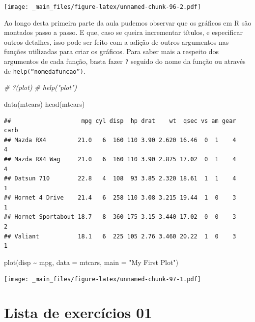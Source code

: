 \documentclass[
]{book}
\newenvironment{Shaded}{\begin{snugshade}}{\end{snugshade}}
\newcommand{\AttributeTok}[1]{\textcolor[rgb]{0.77,0.63,0.00}{#1}}
\newcommand{\CommentTok}[1]{\textcolor[rgb]{0.56,0.35,0.01}{\textit{#1}}}
\newcommand{\FunctionTok}[1]{\textcolor[rgb]{0.00,0.00,0.00}{#1}}
\newcommand{\NormalTok}[1]{#1}
\newcommand{\SpecialCharTok}[1]{\textcolor[rgb]{0.00,0.00,0.00}{#1}}
\newcommand{\StringTok}[1]{\textcolor[rgb]{0.31,0.60,0.02}{#1}}
\begin{document}
\texttt{[image: \_main\_files/figure-latex/unnamed-chunk-96-2.pdf]}

Ao longo desta primeira parte da aula pudemos observar que os gráficos em R são montados passo a passo. E que, caso se queira incrementar títulos, e especificar outros detalhes, isso pode ser feito com a adição de outros argumentos nas funções utilizadas para criar os gráficos. Para saber mais a respeito dos argumentos de cada função, basta fazer \texttt{?} seguido do nome da função ou através de \texttt{help(“nomedafuncao”)}.

\begin{Shaded}
\begin{Highlighting}[]
\CommentTok{\# \textasciigrave{}?\textasciigrave{}(plot)}
\CommentTok{\# help("plot")}

\FunctionTok{data}\NormalTok{(mtcars)}
\FunctionTok{head}\NormalTok{(mtcars)}
\end{Highlighting}
\end{Shaded}

\begin{verbatim}
##                    mpg cyl disp  hp drat    wt  qsec vs am gear carb
## Mazda RX4         21.0   6  160 110 3.90 2.620 16.46  0  1    4    4
## Mazda RX4 Wag     21.0   6  160 110 3.90 2.875 17.02  0  1    4    4
## Datsun 710        22.8   4  108  93 3.85 2.320 18.61  1  1    4    1
## Hornet 4 Drive    21.4   6  258 110 3.08 3.215 19.44  1  0    3    1
## Hornet Sportabout 18.7   8  360 175 3.15 3.440 17.02  0  0    3    2
## Valiant           18.1   6  225 105 2.76 3.460 20.22  1  0    3    1
\end{verbatim}

\begin{Shaded}
\begin{Highlighting}[]
\FunctionTok{plot}\NormalTok{(disp }\SpecialCharTok{\textasciitilde{}}\NormalTok{ mpg, }\AttributeTok{data =}\NormalTok{ mtcars, }\AttributeTok{main =} \StringTok{"My First Plot"}\NormalTok{)}
\end{Highlighting}
\end{Shaded}

\texttt{[image: \_main\_files/figure-latex/unnamed-chunk-97-1.pdf]}

\hypertarget{lista-de-exercuxedcios-01}{%
\section{Lista de exercícios 01}\label{lista-de-exercuxedcios-01}}
\end{document}

